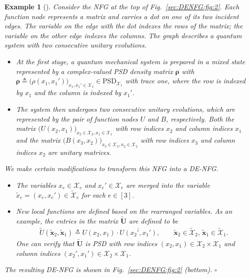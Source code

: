 \documentclass[journal]{IEEEtran}
\newcommand{\add}[1]{{\color{black}#1}}
\newtheorem{example}[theorem]{Example}
\newcommand{\manualendsymbol}[1]{%
  \leavevmode\unskip\penalty9999\hbox{}\nobreak\hfill
  \quad\hbox{#1}}
\newcommand{\eexample}{\manualendsymbol{\ensuremath{\square}}}
\newcommand{\vect}[1]{ \bm{#1} }
\newcommand{\set}[1]{\mathcal{#1}}
\newcommand{\setx}{ \mathcal{X} }
\newcommand{\defeq}{ \triangleq }
\newcommand{\setPSD}[1]{ \mathrm{PSD}_{#1} }
\newcommand{\tset}[1]{\tilde{\mathcal{#1}}}
\newcommand{\matr}[1]{\vect{#1}}
\newcommand{\tx}{ \tilde{x} }
\newcommand{\tvx}{ \tilde{\vect{x}}  }
\begin{document}

\begin{example}[\!\!\cite{Loeliger2012,Loeliger2017}]\label{sec:DENFG:exp:2}
  \add{Consider the NFG at the top of Fig.~\ref{sec:DENFG:fig:2}. Each
    function node represents a matrix and carries a dot on one of its two
    incident edges. The variable on the edge with the dot indexes the rows of
    the matrix; the variable on the other edge indexes the columns. The graph
    describes a quantum system with two consecutive unitary evolutions.}
  \begin{itemize}
    \item At the first stage, a quantum mechanical system is prepared in a mixed
          state represented by a complex-valued PSD density matrix $\matr{\rho}$
          with
          $ \matr{\rho} \defeq \bigl( \rho(x_{1},x_{1}') \bigr)_{\! x_{1},x_{1}' \in
              \set{X}_{1} } \in \setPSD{ \set{X}_{1} } $ with trace one, where the row
          is indexed by $ x_{1} $ and the column is indexed by $ x_{1}' $.

    \item \add{The system then undergoes two consecutive unitary
            evolutions}, which are represented by the pair of function nodes
          $U$ and $B$, respectively. Both the matrix
          $ \bigl( U(x_{2},x_{1}) \bigr)_{\! x_{2} \in \set{X}_{2},x_{1} \in
              \set{X}_{1}} $ with row indices $ x_{2} $ and column indices
          $ x_{1} $ and the matrix
          $ \bigl( B(x_{3},x_{2}) \bigr)_{\! x_{3} \in \set{X}_{3},x_{2} \in
              \set{X}_{2}} $ with row indices $ x_{3} $ and column indices
          $ x_{2} $ are unitary matrices.
  \end{itemize}
  \add{We make certain modifications to transform this NFG into a DE-NFG.}
  \begin{itemize}
    \item The variables $ x_{e} \in \set{X}_{e} $ and $ x_{e}' \in \set{X}_{e} $
          are merged into the variable
          $ \tx_{e} = ( x_{e}, x_{e}' ) \in \tset{X}_{e} $ for each $ e \in [3] $.

    \item New local functions are defined based on the rearranged variables.  As
          an example, the entries in the matrix $\tilde{\matr{U}}$ are defined to be
          \begin{align*}
            \tilde{U}(\tvx_{2},\tvx_{1}) \defeq U(x_{2},x_{1})
            \cdot \overline{U(x_{2}',x_{1}')}, \qquad \tvx_{2} \in \tset{X}_{2},\,
            \tvx_{1} \in \tset{X}_{1}.
          \end{align*}
          One can verify that
          $\tilde{\matr{U}}$ \add{is PSD} with row indices
          $(x_{2},x_{1}) \in \setx_{2} \times \setx_{1} $ and
          column indices
          $(x_{2}',x_{1}') \in \setx_{2} \times \setx_{1} $.
  \end{itemize}
  The resulting DE-NFG is shown in Fig.~\ref{sec:DENFG:fig:2} (\add{bottom}).
  \eexample
\end{example}
\end{document}
